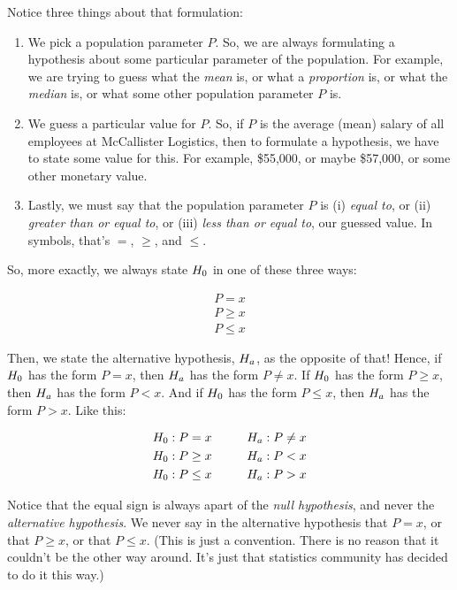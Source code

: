 \documentclass[../../../main.tex]{subfiles}
\begin{document}
\noindent
Notice three things about that formulation:

\begin{enumerate}
  \item We pick a population parameter $P$. So, we are always formulating a hypothesis about some particular parameter of the population. For example, we are trying to guess what the \emph{mean} is, or what a \emph{proportion} is, or what the \emph{median} is, or what some other population parameter $P$ is.

  \item We guess a particular value for $P$. So, if $P$ is the average (mean) salary of all employees at McCallister Logistics, then to formulate a hypothesis, we have to state some value for this. For example, \$55,000, or maybe \$57,000, or some other monetary value.

  \item Lastly, we must say that the population parameter $P$ is (i) \emph{equal to}, or (ii) \emph{greater than or equal to}, or (iii) \emph{less than or equal to}, our guessed value. In symbols, that's $=$, $\geq$, and $\leq$. 

\end{enumerate}

\noindent
So, more exactly, we always state $\NullHyp/$ in one of these three ways:

\begin{align*}
  P = x \\
  P \geq x \\
  P \leq x
\end{align*}

\noindent
Then, we state the alternative hypothesis, $\AltHyp/$, as the opposite of that! Hence, if $\NullHyp/$ has the form $P = x$, then $\AltHyp/$ has the form $P \not = x$. If $\NullHyp/$ has the form $P \geq x$, then $\AltHyp/$ has the form $P < x$. And if $\NullHyp/$ has the form $P \leq x$, then $\AltHyp/$ has the form $P > x$. Like this:

\begin{align*}
  \NullHyp/: P = x \hskip 1cm \AltHyp/: P \not = x \\
  \NullHyp/: P \geq x \hskip 1cm \AltHyp/: P < x \\
  \NullHyp/: P \leq x \hskip 1cm \AltHyp/: P > x \\
\end{align*}

\noindent
Notice that the equal sign is always apart of the \emph{null hypothesis}, and never the \emph{alternative hypothesis}. We never say in the alternative hypothesis that $P = x$, or that $P \geq x$, or that $P \leq x$. (This is just a convention. There is no reason that it couldn't be the other way around. It's just that statistics community has decided to do it this way.)
\end{document}
